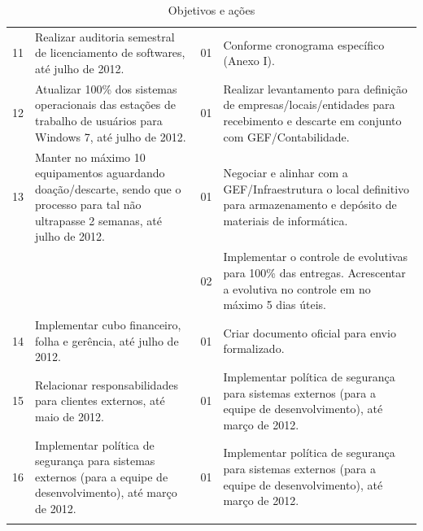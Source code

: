 \documentclass{article}
\begin{document}
\begin{longtable}{|c|p{5cm}|c|p{8cm}|}
11 & Realizar auditoria semestral de licenciamento de softwares, até julho de 2012. & 01 & Conforme cronograma específico (Anexo I). \\
12 & Atualizar 100\% dos sistemas operacionais das estações de trabalho de usuários para Windows 7, até julho de 2012. & 01 & Realizar levantamento para definição de empresas/locais/entidades para recebimento e descarte em conjunto com GEF/Contabilidade. \\
13 & Manter no máximo 10 equipamentos aguardando doação/descarte, sendo que o processo para tal não ultrapasse 2 semanas, até julho de 2012. & 01 & Negociar e alinhar com a GEF/Infraestrutura o local definitivo para armazenamento e depósito de materiais de informática. \\
 & & 02 & Implementar o controle de evolutivas para 100\% das entregas. Acrescentar a evolutiva no controle em no máximo 5 dias úteis. \\
14 & Implementar cubo financeiro, folha e gerência, até julho de 2012. & 01 & Criar documento oficial para envio formalizado. \\
15 & Relacionar responsabilidades para clientes externos, até maio de 2012. & 01 & Implementar política de segurança para sistemas externos (para a equipe de desenvolvimento), até março de 2012. \\
16 & Implementar política de segurança para sistemas externos (para a equipe de desenvolvimento), até março de 2012. & 01 & Implementar política de segurança para sistemas externos (para a equipe de desenvolvimento), até março de 2012. \\
\bottomrule
\caption{Objetivos e ações}
\label{tab:objetivos_acoes}
\end{longtable}
\end{document}

